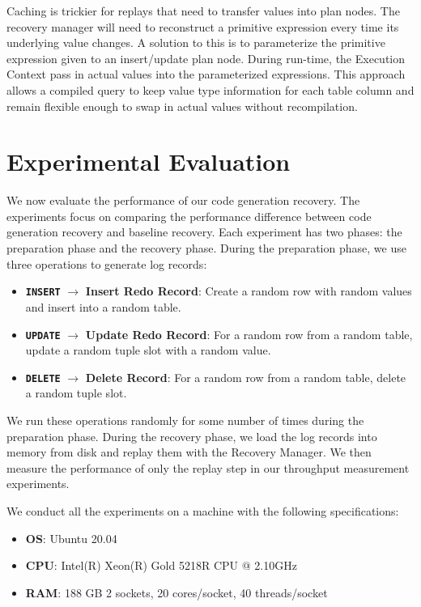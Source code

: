 \documentclass[12pt]{cmuthesis}
\newcommand{\dbSQL}[1]{\texttt{\textbf{#1}}\xspace}
\begin{document}
Caching is trickier for replays that need to transfer values into plan nodes. The recovery manager will need to reconstruct a primitive expression every time its underlying value changes. A solution to this is to parameterize the primitive expression given to an insert/update plan node. During run-time, the Execution Context pass in actual values into the parameterized expressions. This approach allows a compiled query to keep value type information for each table column and remain flexible enough to swap in actual values without recompilation.

\chapter{Experimental Evaluation}
We now evaluate the performance of our code generation recovery. The experiments focus on comparing the performance difference between code generation recovery and baseline recovery. Each experiment has two phases: the preparation phase and the recovery phase. During the preparation phase, we use three operations to generate log records: 
\begin{itemize}
    \item \dbSQL{INSERT} $\rightarrow$ \textbf{Insert Redo Record}: Create a random row with random values and insert into a random table.
    \item \dbSQL{UPDATE} $\rightarrow$ \textbf{Update Redo Record}: For a random row from a random table, update a random tuple slot with a random value.
    \item \dbSQL{DELETE} $\rightarrow$ \textbf{Delete Record}: For a random row from a random table, delete a random tuple slot.
\end{itemize}
We run these operations randomly for some number of times during the preparation phase. During the recovery phase, we load the log records into memory from disk and replay them with the Recovery Manager. We then measure the performance of only the replay step in our throughput measurement experiments.

We conduct all the experiments on a machine with the following specifications:
\begin{itemize}
    \item \textbf{OS}: Ubuntu 20.04
    \item \textbf{CPU}: Intel(R) Xeon(R) Gold 5218R CPU @ 2.10GHz
    \item \textbf{RAM}: 188 GB 2 sockets, 20 cores/socket, 40 threads/socket
\end{itemize}
\end{document}
